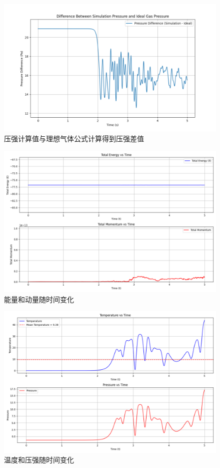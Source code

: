 \documentclass[11pt]{article}
\begin{document}
\begin{question}
\begin{figure}[H]
  \centering
  \includegraphics[width=0.7\columnwidth]{1/d3.png}
  \caption{压强计算值与理想气体公式计算得到压强差值}
\end{figure}

\begin{figure}[H]
  \centering
  \includegraphics[width=0.7\columnwidth]{1/e1.png}
  \caption{能量和动量随时间变化}
\end{figure}
\begin{figure}[H]
  \centering
  \includegraphics[width=0.7\columnwidth]{1/e2.png}
  \caption{温度和压强随时间变化}
\end{figure}


\end{question}
\end{document}
